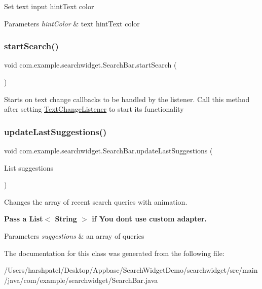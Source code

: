 Set text input hint\+Text color


\begin{DoxyParams}{Parameters}
{\em hint\+Color} & text hint\+Text color \\
\hline
\end{DoxyParams}
\mbox{\label{classcom_1_1example_1_1searchwidget_1_1_search_bar_a8cdd994a66ea763883b6d3ed89d2d299}} 
\subsubsection{\texorpdfstring{startSearch()}{startSearch()}}
{\footnotesize\ttfamily void com.\+example.\+searchwidget.\+Search\+Bar.\+start\+Search (\begin{DoxyParamCaption}{ }\end{DoxyParamCaption})}

Starts on text change callbacks to be handled by the listener. Call this method after setting \mbox{\hyperlink{interfacecom_1_1example_1_1searchwidget_1_1_search_bar_1_1_text_change_listener}{Text\+Change\+Listener}} to start its functionality \mbox{\label{classcom_1_1example_1_1searchwidget_1_1_search_bar_af6c85628bb5df58074e37d47193bc3f0}} 
\subsubsection{\texorpdfstring{updateLastSuggestions()}{updateLastSuggestions()}}
{\footnotesize\ttfamily void com.\+example.\+searchwidget.\+Search\+Bar.\+update\+Last\+Suggestions (\begin{DoxyParamCaption}\item[{List}]{suggestions }\end{DoxyParamCaption})}

Changes the array of recent search queries with animation. 

{\bfseries{Pass a List$<$ String $>$ if You don\textquotesingle{}t use custom adapter.}}


\begin{DoxyParams}{Parameters}
{\em suggestions} & an array of queries \\
\hline
\end{DoxyParams}


The documentation for this class was generated from the following file\+:\begin{DoxyCompactItemize}
\item 
/\+Users/harshpatel/\+Desktop/\+Appbase/\+Search\+Widget\+Demo/searchwidget/src/main/java/com/example/searchwidget/Search\+Bar.\+java\end{DoxyCompactItemize}
